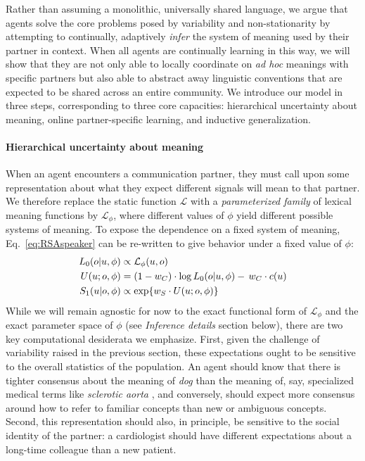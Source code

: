 Rather than assuming a monolithic, universally shared language, we argue that agents solve the core problems posed by variability and non-stationarity by attempting to continually, adaptively \emph{infer} the system of meaning used by their partner in context.
When all agents are continually learning in this way, we will show that they are not only able to locally coordinate on \emph{ad hoc} meanings with specific partners but also able to abstract away linguistic conventions that are expected to be shared across an entire community.
We introduce our model in three steps, corresponding to three core capacities: hierarchical uncertainty about meaning, online partner-specific learning, and inductive generalization.

\paragraph{Hierarchical uncertainty about meaning} 

When an agent encounters a communication partner, they must call upon some representation about what they expect different signals will mean to that partner. 
We therefore replace the static function $\mathcal{L}$ with a \emph{parameterized family} of lexical meaning functions by $\mathcal{L}_{\phi}$, where different values of $\phi$ yield different possible systems of meaning. 
To expose the dependence on a fixed system of meaning, Eq.~\ref{eq:RSAspeaker} can be re-written to give behavior under a fixed value of $\phi$:
\begin{align}
L_0(o | u, \phi) &\propto  \mathcal{L}_\phi(u,o)\hfill\label{eq:RSA} \\
U(u; o, \phi) & = (1-w_C) \cdot \log L_0(o | u, \phi) -\, w_C \cdot c(u) \nonumber  \\
S_1(u | o,\phi) & \propto   \exp\{w_S \cdot U(u; o, \phi)\} \nonumber 
\end{align}
While we will remain agnostic for now to the exact functional form of $\mathcal{L}_\phi$ and the exact parameter space of $\phi$ (see \emph{Inference details} section below), there are two key computational desiderata we emphasize.
First, given the challenge of variability raised in the previous section, these expectations ought to be sensitive to the overall statistics of the population. 
An agent should know that there is tighter consensus about the meaning of \emph{dog} than the meaning of, say, specialized medical terms like \emph{sclerotic aorta} \cite{Clark98_CommunalLexicons}, and conversely, should expect more consensus around how to refer to familiar concepts than new or ambiguous concepts.
Second, this representation should also, in principle, be sensitive to the social identity of the partner: a cardiologist should have different expectations about a long-time colleague than a new patient.

